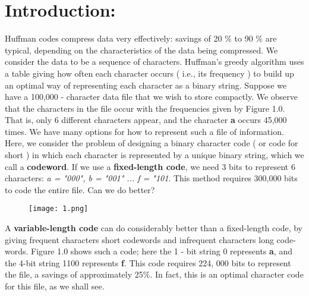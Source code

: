 \section{Introduction:}

Huffman codes compress data very effectively: savings of 20 $\%$ to 90 $\%$ are typical, depending on the characteristics of the data being compressed. We consider the data to be a sequence of characters. Huffman’s greedy algorithm uses a table giving how often each character occurs ( i.e., its frequency ) to build up an optimal way of representing each character as a binary string. Suppose we have a 100,000 - character data file that we wish to store compactly. We observe that the characters in the file occur with the frequencies given by Figure 1.0. That is, only 6 different characters appear, and the character {\bfseries a} occurs 45,000 times. We have many options for how to represent such a file of information. Here, we consider the problem of designing a binary character code ( or code for short ) in which each character is represented by a unique binary string, which we call a {\bfseries codeword}. If we use a {\bfseries fixed-length code}, we need 3 bits to represent 6 characters: {\itshape a = "000", b = "001" ... f = "101}. This method requires 300,000 bits to code the entire file. Can we do better?

\begin{figure}[H]
\texttt{[image: 1.png]}
\centering \linebreak {}
\end{figure} \hfill \break

A {\bfseries variable-length code} can do considerably better than a fixed-length code, by giving frequent characters short codewords and infrequent characters long code- words. Figure 1.0 shows such a code; here the 1 - bit string 0 represents {\bfseries a}, and the 4-bit string 1100 represents {\bfseries f}. This code requires 224, 000 bits to represent the file, a savings of approximately 25$\%$. In fact, this is an optimal character code for this file, as we shall see.
\pagebreak